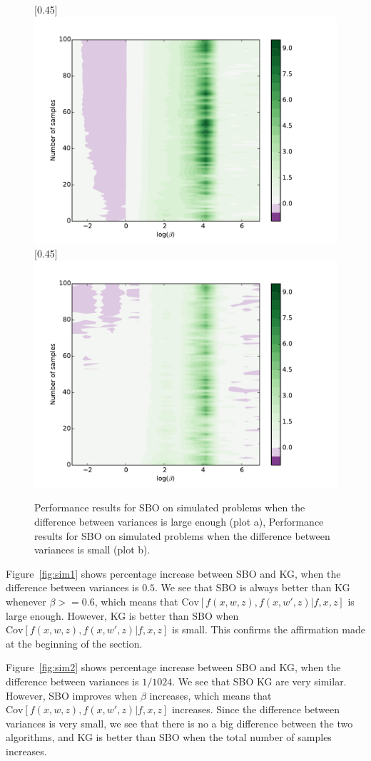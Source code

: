 \documentclass{article}
\newcommand{\w}{w}
\newcommand{\z}{z}
\begin{document}
\begin{figure}[!htb]
    \centering
{}[0.45\linewidth]{
    \includegraphics[width=0.45\linewidth]{contourPlotbetahN1A2ver2.pdf}}
    \quad
    [0.45\linewidth]{
      \includegraphics[width=0.45\linewidth]{contourPlotbetahN8A2ver2.pdf}}

\caption{Performance results for SBO on simulated problems when the difference between variances is large enough  (plot a), Performance results for SBO on simulated problems when the difference between variances is small  (plot b).
    \label{fig:simulated}}
\end{figure}


 

Figure~\ref{fig:sim1} shows percentage increase between SBO and KG, when the difference between variances is $0.5$. We see that SBO is always better than KG whenever $\beta >= 0.6$, which means that $\mbox{Cov}\left[f\left(x,\w,\z\right),f\left(x,\w',\z\right)|f,x,z\right]$ is large enough. However, KG is better than SBO when $\mbox{Cov}\left[f\left(x,\w,\z\right),f\left(x,\w',\z\right)|f,x,z\right]$ is small. This confirms the affirmation made at the beginning of the section.

Figure~\ref{fig:sim2} shows percentage increase between SBO and KG, when the difference between variances is $1/1024$. We see that SBO KG are very similar. However, SBO improves when $\beta$ increases, which means that $\mbox{Cov}\left[f\left(x,\w,\z\right),f\left(x,\w',\z\right)|f,x,z\right]$ increases. Since the difference between variances is very small, we see that there is no a big difference between the two algorithms, and KG is better than SBO when the total number of samples increases.
\end{document}

